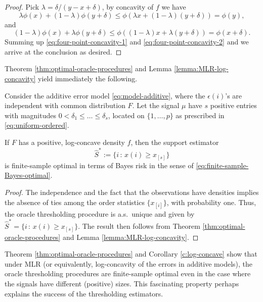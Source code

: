 \begin{proof}%
Pick $\lambda = \delta/(y-x+\delta)$, by concavity of $f$ we have
\begin{equation} \label{eq:four-point-concavity-1}
    \lambda \phi(x) + (1-\lambda) \phi(y+\delta) 
    \le \phi(\lambda x + (1-\lambda)(y+\delta)) 
    = \phi(y),
\end{equation}
and
\begin{equation} \label{eq:four-point-concavity-2}
    (1-\lambda) \phi(x) + \lambda \phi(y+\delta)
    \le \phi((1-\lambda) x + \lambda(y+\delta)) 
    = \phi(x+\delta).
\end{equation}
Summing up \eqref{eq:four-point-concavity-1} and \eqref{eq:four-point-concavity-2} and we arrive at the conclusion as desired.
\end{proof}

Theorem \ref{thm:optimal-oracle-procedures} and Lemma \ref{lemma:MLR-log-concavity} yield immediately the following.

\begin{corollary} \label{c:log-concave}
Consider the additive error model \eqref{eq:model-additive}, where the $\epsilon(i)$'s are
independent with common distribution $F$.  Let the signal $\mu$ have $s$ positive entries with magnitudes $0<\delta_1\le\ldots\le\delta_s$, located on $\{1,\ldots,p\}$ as prescribed in \eqref{eq:uniform-ordered}.

If $F$ has a positive, log-concave density $f$, then the support estimator %
$$
 \widehat{S}^* := \{i\, :\, x(i)\ge x_{[s]}\}
$$ 
is  %
finite-sample optimal in terms of Bayes risk in the sense of \eqref{eq:finite-sample-Bayes-optimal}.
\end{corollary} 
\begin{proof} The independence and the fact that the observations have densities implies the absence of 
ties among the order statistics $\{x_{[i]}\}$, with probability one.  Thus, the oracle thresholding procedure is a.s.\ unique 
and given by $\widehat{S}^* = \{i\, :\, x(i)\ge x_{[s]}\}$.  The result then follows from 
Theorem \ref{thm:optimal-oracle-procedures} and Lemma \ref{lemma:MLR-log-concavity}.
\end{proof}

\begin{remark}
Theorem \ref{thm:optimal-oracle-procedures} and Corollary \ref{c:log-concave} show that under MLR (or equivalently, 
log-concavity of the errors in additive models), the oracle thresholding procedures are finite-sample optimal even in the case where the signals have different (positive) sizes. This fascinating property perhaps 
explains the success of the thresholding estimators.
\end{remark}

